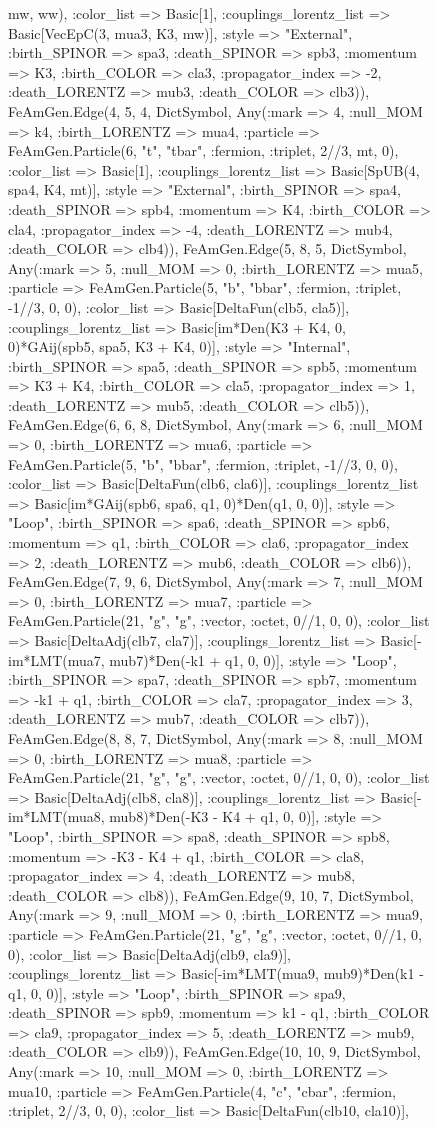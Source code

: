 \documentclass{revtex4}
\begin{document}
\begin{figure}[!htb]
\begin{center}
{mw, ww), :color_list => Basic[1], :couplings_lorentz_list => Basic[VecEpC(3, mua3, K3, mw)], :style => "External", :birth_SPINOR => spa3, :death_SPINOR => spb3, :momentum => K3, :birth_COLOR => cla3, :propagator_index => -2, :death_LORENTZ => mub3, :death_COLOR => clb3)), FeAmGen.Edge(4, 5, 4, Dict{Symbol, Any}(:mark => 4, :null_MOM => k4, :birth_LORENTZ => mua4, :particle => FeAmGen.Particle(6, "t", "tbar", :fermion, :triplet, 2//3, mt, 0), :color_list => Basic[1], :couplings_lorentz_list => Basic[SpUB(4, spa4, K4, mt)], :style => "External", :birth_SPINOR => spa4, :death_SPINOR => spb4, :momentum => K4, :birth_COLOR => cla4, :propagator_index => -4, :death_LORENTZ => mub4, :death_COLOR => clb4)), FeAmGen.Edge(5, 8, 5, Dict{Symbol, Any}(:mark => 5, :null_MOM => 0, :birth_LORENTZ => mua5, :particle => FeAmGen.Particle(5, "b", "bbar", :fermion, :triplet, -1//3, 0, 0), :color_list => Basic[DeltaFun(clb5, cla5)], :couplings_lorentz_list => Basic[im*Den(K3 + K4, 0, 0)*GAij(spb5, spa5, K3 + K4, 0)], :style => "Internal", :birth_SPINOR => spa5, :death_SPINOR => spb5, :momentum => K3 + K4, :birth_COLOR => cla5, :propagator_index => 1, :death_LORENTZ => mub5, :death_COLOR => clb5)), FeAmGen.Edge(6, 6, 8, Dict{Symbol, Any}(:mark => 6, :null_MOM => 0, :birth_LORENTZ => mua6, :particle => FeAmGen.Particle(5, "b", "bbar", :fermion, :triplet, -1//3, 0, 0), :color_list => Basic[DeltaFun(clb6, cla6)], :couplings_lorentz_list => Basic[im*GAij(spb6, spa6, q1, 0)*Den(q1, 0, 0)], :style => "Loop", :birth_SPINOR => spa6, :death_SPINOR => spb6, :momentum => q1, :birth_COLOR => cla6, :propagator_index => 2, :death_LORENTZ => mub6, :death_COLOR => clb6)), FeAmGen.Edge(7, 9, 6, Dict{Symbol, Any}(:mark => 7, :null_MOM => 0, :birth_LORENTZ => mua7, :particle => FeAmGen.Particle(21, "g", "g", :vector, :octet, 0//1, 0, 0), :color_list => Basic[DeltaAdj(clb7, cla7)], :couplings_lorentz_list => Basic[-im*LMT(mua7, mub7)*Den(-k1 + q1, 0, 0)], :style => "Loop", :birth_SPINOR => spa7, :death_SPINOR => spb7, :momentum => -k1 + q1, :birth_COLOR => cla7, :propagator_index => 3, :death_LORENTZ => mub7, :death_COLOR => clb7)), FeAmGen.Edge(8, 8, 7, Dict{Symbol, Any}(:mark => 8, :null_MOM => 0, :birth_LORENTZ => mua8, :particle => FeAmGen.Particle(21, "g", "g", :vector, :octet, 0//1, 0, 0), :color_list => Basic[DeltaAdj(clb8, cla8)], :couplings_lorentz_list => Basic[-im*LMT(mua8, mub8)*Den(-K3 - K4 + q1, 0, 0)], :style => "Loop", :birth_SPINOR => spa8, :death_SPINOR => spb8, :momentum => -K3 - K4 + q1, :birth_COLOR => cla8, :propagator_index => 4, :death_LORENTZ => mub8, :death_COLOR => clb8)), FeAmGen.Edge(9, 10, 7, Dict{Symbol, Any}(:mark => 9, :null_MOM => 0, :birth_LORENTZ => mua9, :particle => FeAmGen.Particle(21, "g", "g", :vector, :octet, 0//1, 0, 0), :color_list => Basic[DeltaAdj(clb9, cla9)], :couplings_lorentz_list => Basic[-im*LMT(mua9, mub9)*Den(k1 - q1, 0, 0)], :style => "Loop", :birth_SPINOR => spa9, :death_SPINOR => spb9, :momentum => k1 - q1, :birth_COLOR => cla9, :propagator_index => 5, :death_LORENTZ => mub9, :death_COLOR => clb9)), FeAmGen.Edge(10, 10, 9, Dict{Symbol, Any}(:mark => 10, :null_MOM => 0, :birth_LORENTZ => mua10, :particle => FeAmGen.Particle(4, "c", "cbar", :fermion, :triplet, 2//3, 0, 0), :color_list => Basic[DeltaFun(clb10, cla10)], }
\end{center}
\end{figure}
\end{document}
